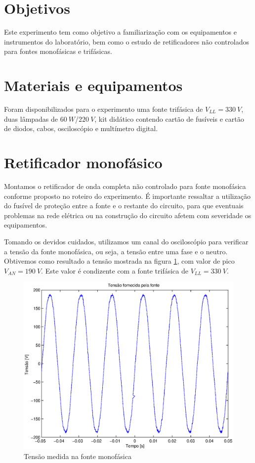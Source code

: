 \documentclass{report}
\begin{document}


\onehalfspacing
\section{Objetivos}
Este experimento tem como objetivo a familiarização com os equipamentos e instrumentos do laboratório, bem como o estudo de retificadores não controlados para fontes monofásicas e trifásicas.

\section{Materiais e equipamentos}
Foram disponibilizados para o experimento uma fonte trifásica de $V_{LL}=330\ V$, duas lâmpadas de $60\ W$/$220\ V$, kit didático contendo cartão de fusíveis e cartão de diodos, cabos, osciloscópio e multímetro digital.

\section{Retificador monofásico}
Montamos o retificador de onda completa não controlado para fonte monofásica conforme proposto no roteiro do experimento\cite{bb:rexp1}. É importante ressaltar a utilização do fusível de proteção entre a fonte e o restante do circuito, para que eventuais problemas na rede elétrica ou na construção do circuito afetem com severidade os equipamentos.

Tomando os devidos cuidados, utilizamos um canal do osciloscópio para verificar a tensão da fonte monofásica, ou seja, a tensão entre uma fase e o neutro. Obtivemos como resultado a tensão mostrada na figura \ref{fig:mono_s}, com valor de pico $V_{AN}=190\ V$. Este valor é condizente com a fonte trifásica de $V_{LL}=330\ V$.

\begin{figure}[H]
	\centering
	\includegraphics[width=\linewidth]{dados/monofasico/mono_s}
	\caption{Tensão medida na fonte monofásica}
	\label{fig:mono_s}
\end{figure}
\end{document}
